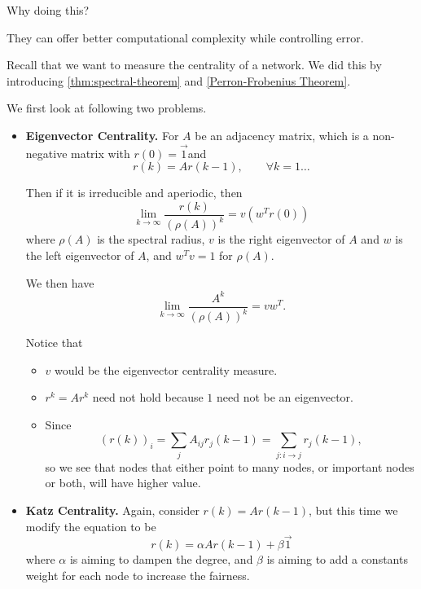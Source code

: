 \begin{problem}
Why doing this?
\end{problem}
\begin{answer}
	They can offer better computational complexity while controlling error.
\end{answer}

\begin{problem}
Recall that we want to measure the centrality of a network. We did this by introducing \autoref{thm:spectral-theorem} and
\autoref{Perron-Frobenius Theorem}.

We first look at following two problems.
\begin{itemize}
	\item \textbf{Eigenvector Centrality.} For \(A\) be an adjacency matrix, which is a non-negative matrix with \(r(0) = \vec{1}\)and
	      \[
		      r(k) = Ar(k - 1), \qquad \forall k = 1\ldots
	      \]

	      Then if it is irreducible and aperiodic, then
	      \[
		      \lim_{k\to \infty } \frac{r(k)}{(\rho(A))^k} = v(w^{T} r(0))
	      \]
	      where \(\rho(A)\) is the spectral radius, \(v\) is the right eigenvector of \(A\) and \(w\) is the left eigenvector of \(A\), and \(w^{T}v = 1\) for \(\rho(A)\).

	      We then have
	      \[
		      \lim_{k\to \infty}\frac{A^k}{(\rho(A))^k} = vw^{T}.
	      \]

	      \begin{remark}
		      Notice that
		      \begin{itemize}
			      \item \(v\) would be the eigenvector centrality measure.
			      \item \(r^k = A r^k\) need not hold because \(1\) need not be an eigenvector.
			      \item Since
			            \[
				            (r(k))_i = \sum\limits_{j} A_{ij}r_{j}(k - 1) = \sum\limits_{j:i\to j} r_j(k-1),
			            \]
			            so we see that nodes that either point to many nodes, or important nodes or both, will have higher value.
		      \end{itemize}
	      \end{remark}
	\item \textbf{Katz Centrality.} Again, consider \(r(k) = Ar(k - 1)\), but this time we modify the equation to be
	      \[
		      r(k) = \alpha Ar(k - 1) + \beta \vec{1}
	      \]
	      where \(\alpha\) is aiming to dampen the degree, and \(\beta\) is aiming to add a constants weight for each node to increase the fairness.


\end{itemize}
\end{problem}

